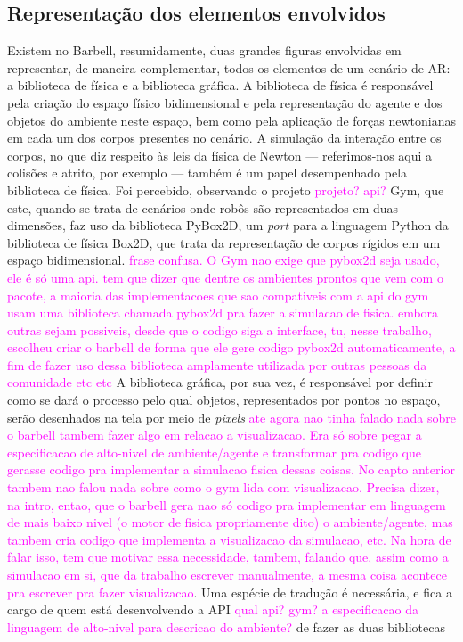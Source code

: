 \documentclass[cic,tc]{iiufrgs}
\newcommand\bruno[1]{\textcolor{magenta}{#1}}
\begin{document}
\subsection{Representação dos elementos envolvidos}
Existem no Barbell, resumidamente, duas grandes figuras envolvidas em representar, de maneira complementar, todos os elementos de um cenário de AR: a biblioteca
de física e a biblioteca gráfica. A biblioteca de física é responsável pela criação do espaço físico bidimensional e pela representação do agente e dos objetos
do ambiente neste espaço, bem como pela aplicação de forças newtonianas em cada um dos corpos presentes no cenário. A simulação da interação entre os corpos, no que diz
respeito às leis da física de Newton --- referimos-nos aqui a colisões e atrito, por exemplo --- também é um papel desempenhado pela biblioteca de física.
Foi percebido, observando o projeto \bruno{projeto? api?} Gym, que este, quando se trata de cenários onde robôs são representados em duas dimensões, faz uso da biblioteca PyBox2D,
um \textit{port} para a linguagem Python da biblioteca de física Box2D, que trata da representação de corpos rígidos em um espaço bidimensional. \bruno{frase confusa. O Gym nao exige que pybox2d seja usado, ele é só uma api. tem que dizer que dentre os ambientes prontos que vem com o pacote, a maioria das implementacoes que sao compativeis com a api do gym usam uma biblioteca chamada pybox2d pra fazer a simulacao de fisica. embora outras sejam possiveis, desde que o codigo siga a interface, tu, nesse trabalho, escolheu criar o barbell de forma que ele gere codigo pybox2d automaticamente, a fim de fazer uso dessa biblioteca amplamente utilizada por outras pessoas da comunidade etc etc}
A biblioteca gráfica, por sua vez, é responsável por definir como se dará o processo pelo qual objetos, representados por pontos no espaço, serão desenhados
na tela por meio de \textit{pixels} \bruno{ate agora nao tinha falado nada sobre o barbell tambem fazer algo em relacao a visualizacao. Era só sobre pegar a especificacao de alto-nivel de ambiente/agente e transformar pra codigo que gerasse codigo pra implementar a simulacao fisica dessas coisas. No capto anterior tambem nao falou nada sobre como o gym lida com visualizacao. Precisa dizer, na intro, entao, que o barbell gera nao só codigo pra implementar em linguagem de mais baixo nivel (o motor de fisica propriamente dito) o ambiente/agente, mas tambem cria codigo que implementa a visualizacao da simulacao, etc. Na hora de falar isso, tem que motivar essa necessidade, tambem, falando que, assim como a simulacao em si, que da trabalho escrever manualmente, a mesma coisa acontece pra escrever pra fazer visualizacao}. Uma espécie de tradução é necessária, e fica a cargo de quem está desenvolvendo a API \bruno{qual api? gym? a especificacao da linguagem de alto-nivel para descricao do ambiente?} de fazer as duas bibliotecas
\end{document}

